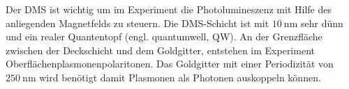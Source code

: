 Der DMS ist wichtig um im Experiment die Photolumineszenz mit Hilfe des anliegenden
Magnetfelds zu steuern. 
Die DMS-Schicht ist mit $\SI{10}{\nano\meter}$ sehr dünn und ein realer Quantentopf (engl. quantumwell, QW).
An der Grenzfläche zwischen der Deckschicht und dem Goldgitter, entstehen im Experiment Oberflächenplasmonenpolaritonen.
Das Goldgitter mit einer Periodizität von $\SI{250}{\nano\meter}$ wird benötigt damit Plasmonen als Photonen
auskoppeln können.